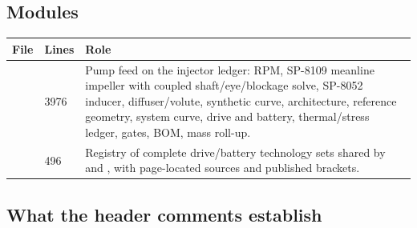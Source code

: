 \subsection{Modules}

{\small
\begin{longtable}{@{}P{4.2cm}P{1.0cm}P{11.0cm}@{}}
\toprule
\textbf{File} & \textbf{Lines} & \textbf{Role} \\
\midrule
\endhead
{} & 3976 & Pump feed on the injector ledger: RPM, SP-8109 meanline impeller with coupled shaft/eye/blockage solve, SP-8052 inducer, diffuser/volute, synthetic curve, architecture, reference geometry, system curve, drive and battery, thermal/stress ledger, gates, BOM, mass roll-up. \\
 & 496 & Registry of complete drive/battery technology sets shared by  and , with page-located sources and published brackets. \\
\bottomrule
\end{longtable}}

\subsection{What the header comments establish}

\subsubsection*{}

